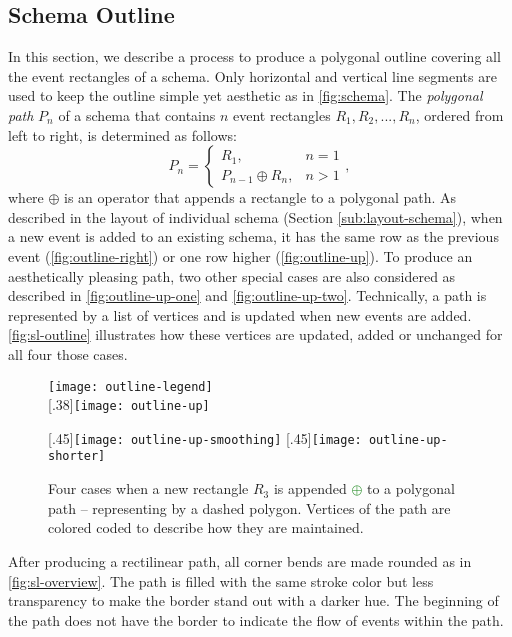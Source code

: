 \subsection{Schema Outline}
In this section, we describe a process to produce a polygonal outline covering all the event rectangles of a schema. Only horizontal and vertical line segments are used to keep the outline simple yet aesthetic as in \autoref{fig:schema}. The \emph{polygonal path} $P_n$ of a schema that contains $n$ event rectangles $R_1, R_2, ..., R_n$, ordered from left to right, is determined as follows:
\[
P_n=
\begin{cases}
R_1, & n=1 \\
P_{n-1} \oplus R_n, & n > 1
\end{cases},
\]
where $\oplus$ is an operator that appends a rectangle to a polygonal path. As described in the layout of individual schema (Section \ref{sub:layout-schema}), when a new event is added to an existing schema, it has the same row as the previous event (\autoref{fig:outline-right}) or one row higher (\autoref{fig:outline-up}). To produce an aesthetically pleasing path, two other special cases are also considered as described in \autoref{fig:outline-up-one} and \autoref{fig:outline-up-two}. Technically, a path is represented by a list of vertices and is updated when new events are added. \autoref{fig:sl-outline} illustrates how these vertices are updated, added or unchanged for all four those cases.

\begin{figure}
	\centering
	\texttt{[image: outline-legend]}\bigskip\\
\hfill
{}[.38\linewidth]{\texttt{[image: outline-up]}}

\vspace{.5\baselineskip}

[.45\linewidth]{\texttt{[image: outline-up-smoothing]}}
\hfill
{}[.45\linewidth]{\texttt{[image: outline-up-shorter]}}
	\caption[Rectangle appended into a polygonal path]{Four cases when a new rectangle \colorbox{f2!40}{$R_3$} is appended \textcolor{ForestGreen}{$\pmb{\oplus}$} to a polygonal path -- representing by a dashed polygon. Vertices of the path are colored coded to describe how they are maintained.}
	\label{fig:sl-outline}
\end{figure}

After producing a rectilinear path, all corner bends are made rounded as in \autoref{fig:sl-overview}. The path is filled with the same stroke color but less transparency to make the border stand out with a darker hue. The beginning of the path does not have the border to indicate the flow of events within the path.
